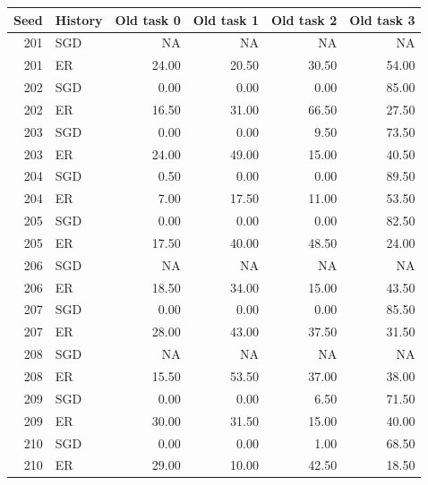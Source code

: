 \begin{tabular}{rlrrrr}
\toprule
Seed & History & Old task 0 & Old task 1 & Old task 2 & Old task 3 \\
\midrule
201 & SGD & NA & NA & NA & NA \\
201 & ER & 24.00 & 20.50 & 30.50 & 54.00 \\
202 & SGD & 0.00 & 0.00 & 0.00 & 85.00 \\
202 & ER & 16.50 & 31.00 & 66.50 & 27.50 \\
203 & SGD & 0.00 & 0.00 & 9.50 & 73.50 \\
203 & ER & 24.00 & 49.00 & 15.00 & 40.50 \\
204 & SGD & 0.50 & 0.00 & 0.00 & 89.50 \\
204 & ER & 7.00 & 17.50 & 11.00 & 53.50 \\
205 & SGD & 0.00 & 0.00 & 0.00 & 82.50 \\
205 & ER & 17.50 & 40.00 & 48.50 & 24.00 \\
206 & SGD & NA & NA & NA & NA \\
206 & ER & 18.50 & 34.00 & 15.00 & 43.50 \\
207 & SGD & 0.00 & 0.00 & 0.00 & 85.50 \\
207 & ER & 28.00 & 43.00 & 37.50 & 31.50 \\
208 & SGD & NA & NA & NA & NA \\
208 & ER & 15.50 & 53.50 & 37.00 & 38.00 \\
209 & SGD & 0.00 & 0.00 & 6.50 & 71.50 \\
209 & ER & 30.00 & 31.50 & 15.00 & 40.00 \\
210 & SGD & 0.00 & 0.00 & 1.00 & 68.50 \\
210 & ER & 29.00 & 10.00 & 42.50 & 18.50 \\
\bottomrule
\end{tabular}
